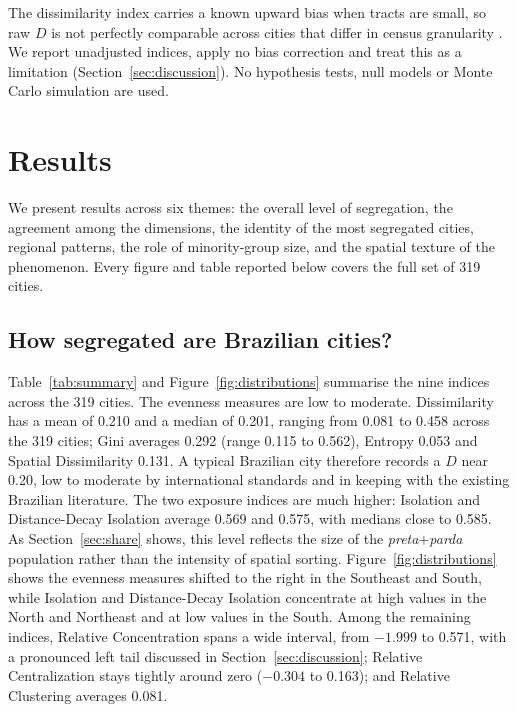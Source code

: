 \documentclass[pdflatex,sn-basic]{sn-jnl}%
\begin{document}
The dissimilarity index carries a known upward bias when tracts are small, so raw $D$ is not perfectly comparable across cities that differ in census granularity \citep{cortese1976further, carrington1997measuring, allen2015more}. We report unadjusted indices, apply no bias correction and treat this as a limitation (Section~\ref{sec:discussion}). No hypothesis tests, null models or Monte Carlo simulation are used.

\section{Results}\label{sec:results}

We present results across six themes: the overall level of segregation, the agreement among the dimensions, the identity of the most segregated cities, regional patterns, the role of minority-group size, and the spatial texture of the phenomenon. Every figure and table reported below covers the full set of 319 cities.

\subsection{How segregated are Brazilian cities?}\label{sec:dist}

Table~\ref{tab:summary} and Figure~\ref{fig:distributions} summarise the nine indices across the 319 cities. The evenness measures are low to moderate. Dissimilarity has a mean of 0.210 and a median of 0.201, ranging from 0.081 to 0.458 across the 319 cities; Gini averages 0.292 (range 0.115 to 0.562), Entropy 0.053 and Spatial Dissimilarity 0.131. A typical Brazilian city therefore records a $D$ near 0.20, low to moderate by international standards and in keeping with the existing Brazilian literature. The two exposure indices are much higher: Isolation and Distance-Decay Isolation average 0.569 and 0.575, with medians close to 0.585. As Section~\ref{sec:share} shows, this level reflects the size of the \emph{preta}$+$\emph{parda} population rather than the intensity of spatial sorting. Figure~\ref{fig:distributions} shows the evenness measures shifted to the right in the Southeast and South, while Isolation and Distance-Decay Isolation concentrate at high values in the North and Northeast and at low values in the South. Among the remaining indices, Relative Concentration spans a wide interval, from $-1.999$ to 0.571, with a pronounced left tail discussed in Section~\ref{sec:discussion}; Relative Centralization stays tightly around zero ($-0.304$ to 0.163); and Relative Clustering averages 0.081.
\end{document}
